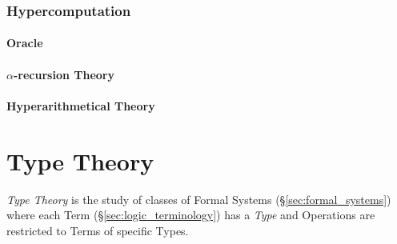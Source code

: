 \documentclass{article}
\begin{document}
\section{Hypercomputation}\label{sec:hypercomputation}

\subsection{Oracle}\label{sec:oracle}

\subsection{$\alpha$-recursion Theory}\label{subsec:alpha_recursion}

\subsection{Hyperarithmetical Theory}\label{subsec:hyperarithmetical_theory}



\part{Type Theory}\label{sec:type_theory}

\emph{Type Theory} is the study of classes of Formal Systems
(\S\ref{sec:formal_systems}) where each Term
(\S\ref{sec:logic_terminology}) has a \emph{Type} and Operations
are restricted to Terms of specific Types.
\end{document}
